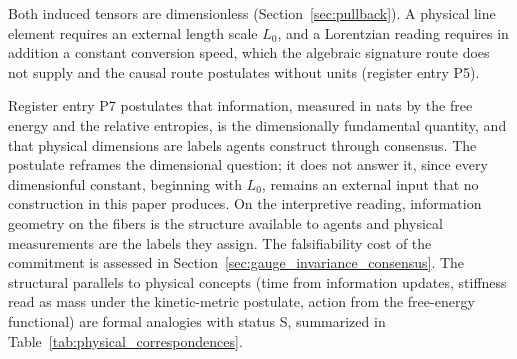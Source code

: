 Both induced tensors are dimensionless (Section~\ref{sec:pullback}). A physical line element requires an external length scale $L_0$, and a Lorentzian reading requires in addition a constant conversion speed, which the algebraic signature route does not supply and the causal route postulates without units (register entry P5).

Register entry P7 postulates that information, measured in nats by the free energy and the relative entropies, is the dimensionally fundamental quantity, and that physical dimensions are labels agents construct through consensus. The postulate reframes the dimensional question; it does not answer it, since every dimensionful constant, beginning with $L_0$, remains an external input that no construction in this paper produces. On the interpretive reading, information geometry on the fibers is the structure available to agents and physical measurements are the labels they assign. The falsifiability cost of the commitment is assessed in Section~\ref{sec:gauge_invariance_consensus}. The structural parallels to physical concepts (time from information updates, stiffness read as mass under the kinetic-metric postulate, action from the free-energy functional) are formal analogies with status S, summarized in Table~\ref{tab:physical_correspondences}.


